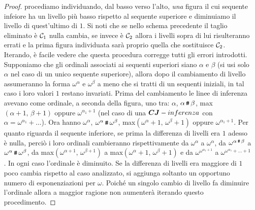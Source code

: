 \begin{proof}
		procediamo individuando, dal basso verso l'alto, \emph{una} figura il cui sequente infeiore ha un livello più basso rispetto al sequente superiore e diminuiamo il livello di quest'ultimo di $1$. Si noti che se nello schema precedente il taglio eliminato è $\mathcal{C}_1$ nulla cambia, se invece è $\mathcal{C}_2$ allora i livelli sopra di lui risulteranno errati e la prima figura individuata sarà proprio quella che sostituisce $\mathcal{C}_2$. Iterando, è facile vedere che questa procedura corregge tutti gli errori introdotti. Supponiamo che gli ordinali associati ai sequenti superiori siano $\alpha$ e $\beta$ (si usi solo $\alpha$ nel caso di un unico sequente superiore), allora dopo il cambiamento di livello assumeranno la forma $\omega^\alpha$ e $\omega^\beta$ a meno che si tratti di un sequenti iniziali, in tal caso i loro valori $1$ restano invariati. Prima del cambiamento le linee di inferenza avevano come ordinale, a seconda della figura, uno tra: $\alpha$, $\alpha\,\texttt{\#}\,\beta$, max$(\alpha+1,\,\beta+1)$ oppure $\omega^{\alpha_1+1}$ (nel caso di una $\bm{CJ}-inferenza$ con $\alpha=\omega^{\alpha_1}+\ldots$). Ora hanno $\omega^\alpha$, $\omega^\alpha\,\texttt{\#}\,\omega^\beta$, max$(\omega^\alpha+1,\,\omega^\beta+1)$ oppure $\omega^{\alpha_1+1}$. Per quanto riguarda il sequente inferiore, se prima la differenza di livelli era $1$ adesso è nulla, perciò i loro ordinali cambieranno rispettivamente da $\omega^\alpha$ a $\omega^\alpha$, da $\omega^{\alpha\,\texttt{\#}\,\beta}$ a $\omega^\alpha\,\texttt{\#}\,\omega^\beta$, da max$(\omega^{\alpha+1},\,\omega^{\beta+1})$ a max$(\omega^\alpha+1,\,\omega^\beta+1)$ e da $\omega^{\omega^{\alpha_1+1}}$ a $\omega^{\omega^{\alpha_1}+\ldots+1}$. In ogni caso l'ordinale è diminuito. Se la differenza di livelli era maggiore di $1$ poco cambia rispetto al caso analizzato, si aggiunga soltanto un opportuno numero di esponenziazioni per $\omega$. Poiché un singolo cambio di livello fa diminuire l'ordinale allora a maggior ragione non aumenterà iterando questo procedimento.


\end{proof}
